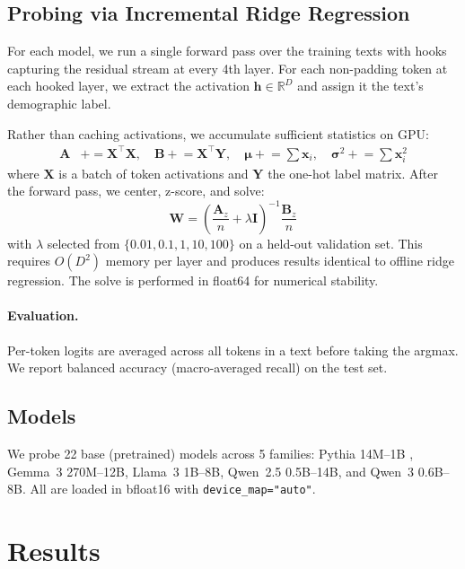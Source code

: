 \documentclass{article}
\begin{document}
\subsection{Probing via Incremental Ridge Regression}

For each model, we run a single forward pass over the training texts with hooks capturing the residual stream at every 4th layer. For each non-padding token at each hooked layer, we extract the activation $\mathbf{h} \in \mathbb{R}^D$ and assign it the text's demographic label.

Rather than caching activations, we accumulate sufficient statistics on GPU:
\begin{align}
    \mathbf{A} &\mathrel{+}= \mathbf{X}^\top \mathbf{X}, \quad
    \mathbf{B} \mathrel{+}= \mathbf{X}^\top \mathbf{Y}, \quad
    \boldsymbol{\mu} \mathrel{+}= \textstyle\sum \mathbf{x}_i, \quad
    \boldsymbol{\sigma}^2 \mathrel{+}= \textstyle\sum \mathbf{x}_i^2
\end{align}
where $\mathbf{X}$ is a batch of token activations and $\mathbf{Y}$ the one-hot label matrix. After the forward pass, we center, z-score, and solve:
\begin{equation}
    \mathbf{W} = \left(\frac{\mathbf{A}_z}{n} + \lambda \mathbf{I}\right)^{-1} \frac{\mathbf{B}_z}{n}
\end{equation}
with $\lambda$ selected from $\{0.01, 0.1, 1, 10, 100\}$ on a held-out validation set. This requires $O(D^2)$ memory per layer and produces results identical to offline ridge regression. The solve is performed in float64 for numerical stability.

\paragraph{Evaluation.} Per-token logits are averaged across all tokens in a text before taking the argmax. We report balanced accuracy (macro-averaged recall) on the test set.

\subsection{Models}

We probe 22 base (pretrained) models across 5 families: Pythia 14M--1B \citep{biderman2023pythia}, Gemma~3 270M--12B, Llama~3 1B--8B, Qwen~2.5 0.5B--14B, and Qwen~3 0.6B--8B. All are loaded in bfloat16 with \texttt{device\_map="auto"}.

\section{Results}
\end{document}
